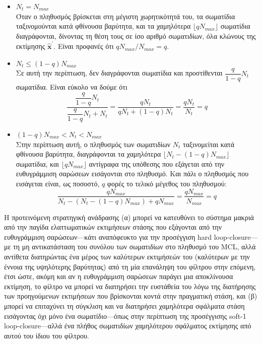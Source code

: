 \begin{itemize}
  \item $N_t = N_{max}$ \\
        Όταν ο πληθυσμός βρίσκεται στη μέγιστη χωρητικότητά του, τα σωματίδια
        ταξινομούνται κατά φθίνουσα βαρύτητα, και τα χαμηλότερα
        $\lfloor q N_{max} \rfloor$ σωματίδια διαγράφονται, δίνοντας τη θέση
        τους σε ίσο αριθμό σωματιδίων, όλα κλώνους της εκτίμησης
        $\hat{\bm{x}}^{\prime}$. Είναι προφανές ότι $q N_{max}/N_{max} = q$.
  \item $N_t \leq (1-q) N_{max}$ \\
        Σε αυτή την περίπτωση, δεν διαγράφονται σωματίδια και προστίθενται
        $\dfrac{q}{1-q}N_t$ σωματίδια. Είναι εύκολο να δούμε ότι
        $$\dfrac{\dfrac{q}{1-q}N_t}{\dfrac{q}{1-q}N_t + N_t} = \dfrac{qN_t}{qN_t + (1-q)N_t} = \dfrac{qN_t}{N_t} = q$$
  \item $(1-q) N_{max} < N_t < N_{max}$ \\
        Στην περίπτωση αυτή, ο πληθυσμός των σωματιδίων $N_t$ ταξινομείται κατά
        φθίνουσα βαρύτητα, διαγράφονται τα χαμηλότερα $\lfloor N_t - (1-q)N_{max} \rfloor$
        σωματίδια, και $\lfloor q N_{max} \rfloor$ αντίγραφα της υπόθεσης που
        εξάγεται από την ευθυγράμμιση σαρώσεων εισάγονται στο πληθυσμό. Και
        πάλι ο πληθυσμός που εισάγεται είναι, ως ποσοστό, $q$ φορές το τελικό
        μέγεθος του πληθυσμού:
        $$\dfrac{qN_{max}}{N_t - (N_t - (1-q)N_{max}) + qN_{max}} = \dfrac{q N_{max}}{N_{max}} = q$$
\end{itemize}

Η προτεινόμενη στρατηγική ανάδρασης (α) μπορεί να κατευθύνει το σύστημα μακριά
από την παγίδα ελαττωματικών εκτιμήσεων στάσης που εξάγονται από την
ευθυγράμμιση σαρώσεων---κάτι αναπόφευκτο για την προσέγγιση hard
loop-closure---με τη μη αντικατάσταση του συνόλου των σωματιδίων στο πληθυσμό
του MCL, αλλά αντίθετα διατηρώντας ένα μέρος των καλύτερων εκτιμήσεών του
(καλύτερων με την έννοια της υψηλότερης βαρύτητας) από τη μία επανάληψη του
φίλτρου στην επόμενη, έτσι ώστε, ακόμη και αν η ευθυγράμμιση σαρώσεων παράγει
μια αποκλίνουσα εκτίμηση, το φίλτρο να μπορεί να διατηρήσει την ευστάθεία του
λόγω της διατήρησης των προηγούμενων εκτιμήσεων που βρίσκονται κοντά στην
πραγματική στάση, και (β) μπορεί να επιταχύνει τη σύγκλιση και να διατηρήσει
χαμηλότερα σφάλματα στάση εισάγοντας όχι μόνο ένα σωματίδιο---όπως στην
περίπτωση της προσέγγισης soft-1 loop-closure---αλλά ένα πλήθος σωματιδίων
χαμηλότερου σφάλματος εκτίμησης από αυτού του ίδιου του φίλτρου.

